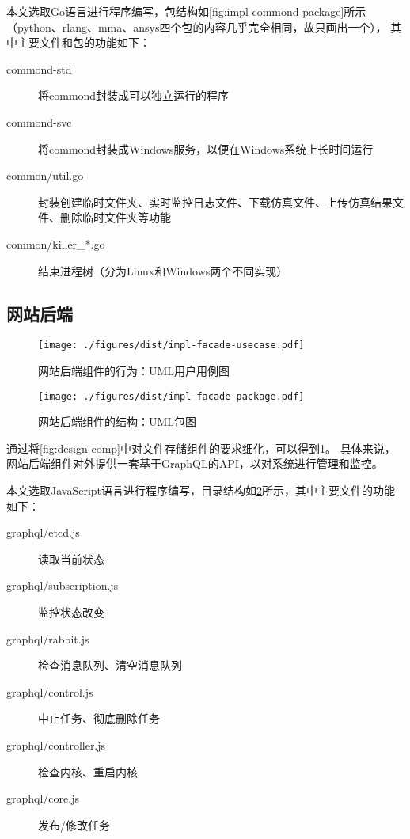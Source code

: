 \documentclass[index]{subfiles}
\begin{document}
本文选取Go语言进行程序编写，包结构如\cref{fig:impl-commond-package}所示（python、rlang、mma、ansys四个包的内容几乎完全相同，故只画出一个），
其中主要文件和包的功能如下：
\begin{description}
  \item[commond-std] 将commond封装成可以独立运行的程序
  \item[commond-svc] 将commond封装成Windows服务，以便在Windows系统上长时间运行
  \item[common/util.go] 封装创建临时文件夹、实时监控日志文件、下载仿真文件、上传仿真结果文件、删除临时文件夹等功能
  \item[common/killer\_*.go] 结束进程树（分为Linux和Windows两个不同实现）
\end{description}

\subsection{网站后端}
\begin{figure}[h]
  \centering
  \texttt{[image: ./figures/dist/impl-facade-usecase.pdf]}
  \caption{网站后端组件的行为：UML用户用例图\label{fig:impl-facade-usecase}}
\end{figure}
\begin{figure}[h]
  \centering
  \texttt{[image: ./figures/dist/impl-facade-package.pdf]}
  \caption{网站后端组件的结构：UML包图\label{fig:impl-facade-package}}
\end{figure}

通过将\cref{fig:design-comp}中对文件存储组件的要求细化，可以得到\cref{fig:impl-facade-usecase}。
具体来说，网站后端组件对外提供一套基于GraphQL的API，以对系统进行管理和监控。

本文选取JavaScript语言进行程序编写，目录结构如\cref{fig:impl-facade-package}所示，其中主要文件的功能如下：
\begin{description}
  \item[graphql/etcd.js] 读取当前状态
  \item[graphql/subscription.js] 监控状态改变
  \item[graphql/rabbit.js] 检查消息队列、清空消息队列
  \item[graphql/control.js] 中止任务、彻底删除任务
  \item[graphql/controller.js] 检查内核、重启内核
  \item[graphql/core.js] 发布/修改任务
\end{description}
\end{document}
